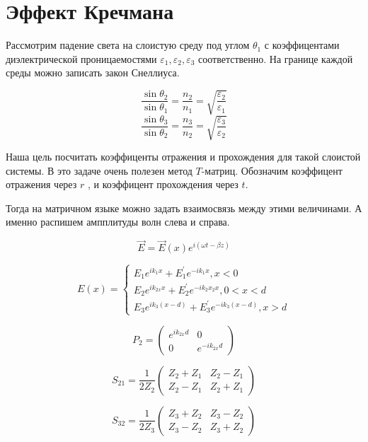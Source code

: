 \section{Эффект Кречмана}





Рассмотрим падение света на слоистую среду под углом $ 
\theta_1 $ с коэффицентами  диэлектрической проницаемостями $ \varepsilon_1, \varepsilon_2, \varepsilon_3 $ соответственно. 
На границе каждой среды можно записать закон Снеллиуса.

	$$
	\frac{\sin{\theta_2}}{\sin{\theta_1}} = \frac{n_2}{n_1} =\sqrt{\frac{\varepsilon_{2}}{\varepsilon_1}}	$$
	$$
	\frac{{\sin\theta_3}}{\sin{\theta_2}} = \frac{n_3}{n_2} =\sqrt{\frac{\varepsilon_{3}}{\varepsilon_2}}	
	$$

Наша цель посчитать коэффиценты отражения и прохождения для такой слоистой системы. В это задаче очень полезен метод $ T $-матриц. Обозначим коэффицент отражения через $ r $ , и коэффицент прохождения через $ t $.

Тогда на матричном языке можно задать взаимосвязь между этими величинами. А именно распишем ампплитуды волн слева и справа.

$$\vec{E}=\vec{E}(x) e^{i(\omega t-\beta z)}$$

$$E(x)=\left\{\begin{array}{c}
E_{1} e^{i k_{1} x}+E_{1}^{\prime} e^{-i k_{1} x}, x<0 \\
E_{2} e^{i k_{2 x} x}+E_{2}^{\prime} e^{-i k_{2} x_{2} x}, 0<x<d \\
E_{3} e^{i k_{3}(x-d)}+E_{3}^{\prime} e^{-i k_{3}(x-d)}, x>d
\end{array}\right.$$

$$P_{2}=\left(\begin{array}{cc}
e^{i k_{2 x} d} & 0 \\
0 & e^{-i k_{2 x} d}
\end{array}\right)$$



$$
S_{21} = 
\frac{1}{2 Z_2}\begin{pmatrix}
	Z_2+Z_1 & Z_2 -Z_1 \\
	Z_2-Z_1 & Z_2+Z_1
\end{pmatrix}
$$


$$
S_{32} = 
\frac{1}{2 Z_3}\begin{pmatrix}
Z_3+Z_2 & Z_3 -Z_2 \\
Z_3-Z_2 & Z_3+Z_2
\end{pmatrix}
$$

